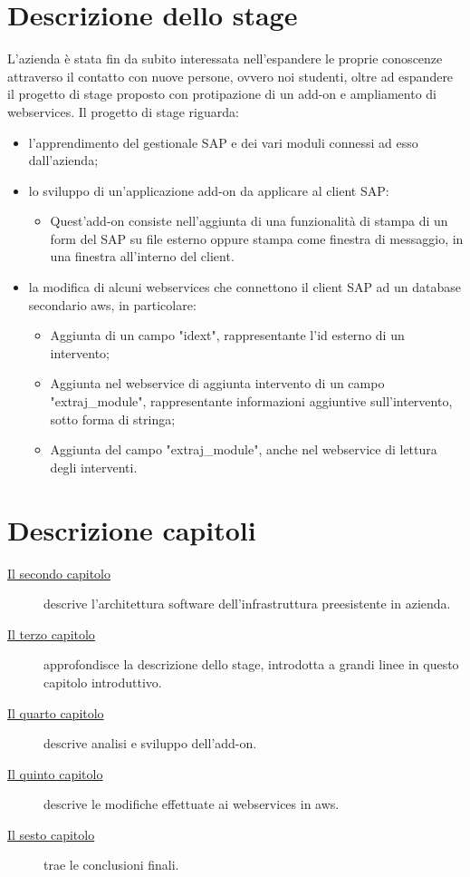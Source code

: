 \section{Descrizione dello stage}
L'azienda è stata fin da subito interessata nell'espandere le proprie conoscenze attraverso il contatto con nuove persone, ovvero noi studenti, oltre ad espandere il progetto di stage proposto con protipazione di un add-on e ampliamento di webservices.
Il progetto di stage riguarda:
\begin{itemize}
	\item l'apprendimento del gestionale SAP e dei vari moduli connessi ad esso dall'azienda;
	\item lo sviluppo di un'applicazione add-on da applicare al client SAP:
	\begin{itemize}
            \item Quest'add-on consiste nell'aggiunta di una funzionalità di stampa di un form del SAP su file esterno oppure stampa come finestra di messaggio, in una finestra all'interno del client.
        \end{itemize}
    \item la modifica di alcuni webservices che connettono il client SAP ad un database secondario \gls{aws}, in particolare:
        \begin{itemize}
            \item Aggiunta di un campo "idext", rappresentante l'id esterno di un intervento;
            \item Aggiunta nel webservice di aggiunta intervento di un campo "extraj\_module", rappresentante informazioni aggiuntive sull'intervento, sotto forma di stringa;
            \item Aggiunta del campo "extraj\_module", anche nel webservice di lettura degli interventi.
        \end{itemize}
	\end{itemize}


\section{Descrizione capitoli}
\begin{description}
	\item[{\hyperref[cap:descrizione-architettura]{Il secondo capitolo}}] descrive l'architettura software dell'infrastruttura preesistente in azienda.
	
	\item[{\hyperref[cap:descrizione-stage]{Il terzo capitolo}}] approfondisce la descrizione dello stage, introdotta a grandi linee in questo capitolo introduttivo.
	
	\item[{\hyperref[cap:sviluppo-addon]{Il quarto capitolo}}] descrive analisi e sviluppo dell'add-on.
	
	\item[{\hyperref[cap:webservices]{Il quinto capitolo}}] descrive le modifiche effettuate ai webservices in \gls{aws}.
	
	\item[{\hyperref[cap:conclusioni]{Il sesto capitolo}}] trae le conclusioni finali.
\end{description}